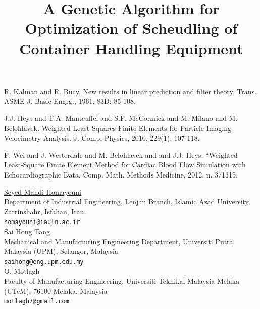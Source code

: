\documentclass[article,A4,11pt]{llncs}%
\begin{document}

\begin{thebibliography}{10}
{\sc R. Kalman and R. Bucy}. {New results in linear prediction and filter theory}. Trans. ASME J. Basic Engrg., 1961, 83D: 85-108.

{\sc J.J. Heys and T.A. Manteuffel and S.F. McCormick and M. Milano and M. Belohlavek}. {Weighted Least-Squares Finite Elements for Particle Imaging Velocimetry Analysis}.  J. Comp. Physics, 2010, 229(1): 107-118.

{\sc F. Wei and J. Westerdale and M. Belohlavek and and J.J. Heys}. {“Weighted Least-Square Finite Element Method for Cardiac Blood Flow Simulation with Echocardiographic Data}. Comp. Math. Methods Medicine, 2012, n. 371315.
\end{thebibliography}

\title{A Genetic Algorithm for Optimization of Scheudling of Container Handling Equipment}
 \author{} \institute{}
\maketitle
\begin{center}
{\large \underline{Seyed Mahdi Homayouni}}\\
Department of Industrial Engineering, Lenjan Branch, Islamic Azad University, Zarrinshahr, Isfahan, Iran.\\
{\tt homayouni@iauln.ac.ir}
\\ \vspace{4mm}
{\large Sai Hong Tang}\\
Mechanical and Manufacturing Engineering Department, Universiti Putra Malaysia (UPM), Selangor, Malaysia\\
{\tt saihong@eng.upm.edu.my}
\\ \vspace{4mm}
{\large O.  Motlagh}\\
Faculty of Manufacturing Engineering, Universiti Teknikal Malaysia Melaka (UTeM), 76100 Melaka, Malaysia\\
{\tt motlagh7@gmail.com}
\end{center}
\end{document}
